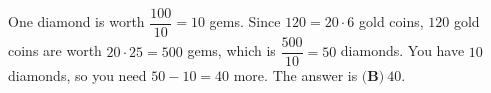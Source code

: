 One diamond is worth $\dfrac{100}{10}=10$ gems. Since $120=20\cdot6$ gold coins, $120$ gold coins are worth $20\cdot25=500$ gems, which is $\dfrac{500}{10}=50$ diamonds. You have $10$ diamonds, so you need $50-10=40$ more. The answer is $\boxed{\textbf{(B)}\ 40}$.
